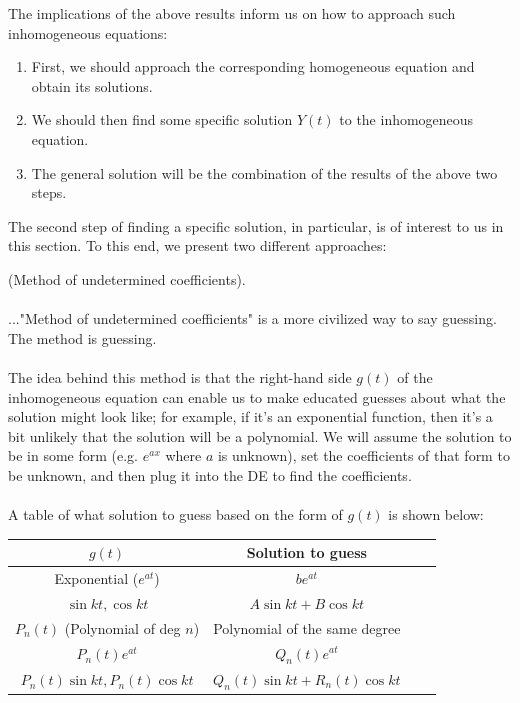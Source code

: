 \documentclass{article}
\begin{document}
The implications of the above results inform us on how to approach such inhomogeneous equations:
\begin{enumerate}
    \item First, we should approach the corresponding homogeneous equation and obtain its solutions.
    \item We should then find some specific solution $Y(t)$ to the inhomogeneous equation.
    \item The general solution will be the combination of the results of the above two steps.
\end{enumerate}
The second step of finding a specific solution, in particular, is of interest to us in this section. To this end, we present two different approaches:
\begin{method}
    (Method of undetermined coefficients). \\ \\
    ..."Method of undetermined coefficients" is a more civilized way to say guessing. The method is guessing. \\ \\
    The idea behind this method is that the right-hand side $g(t)$ of the inhomogeneous equation can enable us to make educated guesses about what the solution might look like; for example, if it's an exponential function, then it's a bit unlikely that the solution will be a polynomial. We will assume the solution to be in some form (e.g. $e^{ax}$ where $a$ is unknown), set the coefficients of that form to be unknown, and then plug it into the DE to find the coefficients.
    \\ \\
    A table of what solution to guess based on the form of $g(t)$ is shown below:
    \begin{center}
        \begin{tabular}{c c c c} 
         
         $g(t)$ & Solution to guess \\ [0.5ex] 
         \hline
         Exponential ($e^{at}$) & $be^{at}$\\ 
         \hline
         $\sin kt, \cos kt$ & $A \sin kt + B \cos kt$\\
         \hline
         $P_n(t)$ (Polynomial of deg $n$) & Polynomial of the same degree \\ 
         \hline
         $P_n(t)e^{at}$ & $Q_n(t)e^{at}$ \\
         \hline
         $P_n(t)\sin kt, P_n(t)\cos kt$ & $Q_n(t)\sin kt + R_n(t)\cos kt$
        \end{tabular}
    \end{center}
\end{method}
\end{document}
